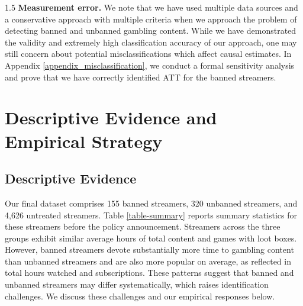 \documentclass[a4paper,12pt]{article}
\begin{document}
\begin{spacing}{1.5}
\noindent \textbf{Measurement error.}  We note that we have used multiple data sources and a conservative approach with multiple
criteria when we approach the problem of detecting banned and unbanned gambling content.
While we have demonstrated the validity and extremely high classification accuracy of our
approach, one may still concern about potential misclassifications which affect causal estimates.
In Appendix \ref{appendix_misclassification}, we conduct a formal sensitivity analysis and prove that we have correctly
identified ATT for the banned streamers.




\section{Descriptive Evidence and Empirical Strategy}\label{section-empirical-strategy}

\subsection{Descriptive Evidence}

Our final dataset comprises 155 banned streamers, 320 unbanned streamers, and 4,626 untreated streamers. Table \ref{table-summary} reports summary statistics for these streamers before the policy announcement. Streamers across the three groups exhibit similar average hours of total content and games with loot boxes. However, banned streamers devote substantially more time to gambling content than unbanned streamers and are also more popular on average, as reflected in total hours watched and subscriptions. These patterns suggest that banned and unbanned streamers may differ systematically, which raises identification challenges. We discuss these challenges and our empirical responses below.


\end{spacing}
\end{document}
